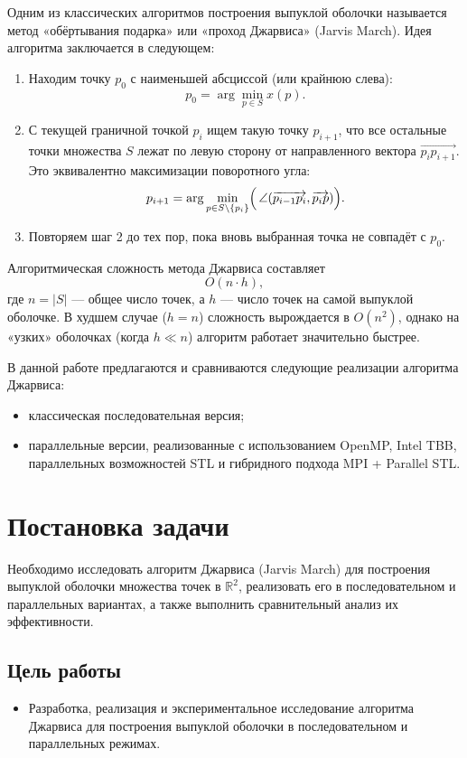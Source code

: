 \documentclass[12pt,a4paper]{article}
\begin{document}
Одним из классических алгоритмов построения выпуклой оболочки называется метод «обёртывания подарка» или «проход Джарвиса» (Jarvis March). Идея алгоритма заключается в следующем:
\begin{enumerate}
  \item Находим точку $p_0$ с наименьшей абсциссой (или крайнюю слева): 
    \[
      p_0 = \arg\min_{p\in S} x(p).
    \]
  \item С текущей граничной точкой $p_i$ ищем такую точку $p_{i+1}$, что все остальные точки множества $S$ лежат по левую сторону от направленного вектора $\overrightarrow{p_i p_{i+1}}$. Это эквивалентно максимизации поворотного угла:
    \[
      p_{i+1} = \arg\min_{p \in S \setminus \{p_i\}}
                  \Bigl(\, \angle (\overrightarrow{p_{i-1}p_i}, \overrightarrow{p_i p}) \Bigr).
    \]
  \item Повторяем шаг 2 до тех пор, пока вновь выбранная точка не совпадёт с $p_0$.
\end{enumerate}

Алгоритмическая сложность метода Джарвиса составляет
\[
  O(n \cdot h),
\]
где $n = |S|$ — общее число точек, а $h$ — число точек на самой выпуклой оболочке. В худшем случае ($h = n$) сложность вырождается в $O(n^2)$, однако на «узких» оболочках (когда $h \ll n$) алгоритм работает значительно быстрее.

В данной работе предлагаются и сравниваются следующие реализации алгоритма Джарвиса:
\begin{itemize}
  \item классическая последовательная версия;
  \item параллельные версии, реализованные с использованием OpenMP, Intel TBB, параллельных возможностей STL и гибридного подхода MPI + Parallel STL.
\end{itemize}

\section{Постановка задачи}
Необходимо исследовать алгоритм Джарвиса (Jarvis March) для построения выпуклой оболочки множества точек в $\mathbb{R}^2$, реализовать его в последовательном и параллельных вариантах, а также выполнить сравнительный анализ их эффективности.

\subsection*{Цель работы}
\begin{itemize}
    \item Разработка, реализация и экспериментальное исследование алгоритма Джарвиса для построения выпуклой оболочки в последовательном и параллельных режимах.
\end{itemize}
\end{document}
